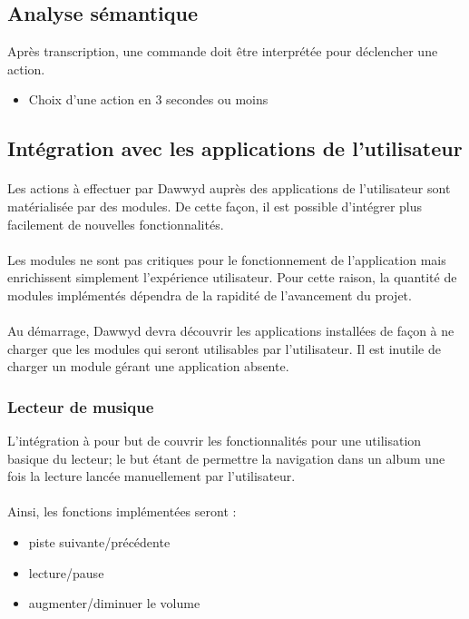 \documentclass[12pt]{article}
\begin{document}
    \subsection{Analyse sémantique}
    Après transcription, une commande doit être interprétée pour déclencher une
    action.
    \begin{itemize}
        \item Choix d'une action en 3 secondes ou moins
    \end{itemize}

    \subsection{Intégration avec les applications de l'utilisateur}
    \paragraph{}
    Les actions à effectuer par Dawwyd auprès des applications de l'utilisateur
    sont matérialisée par des modules. De cette façon, il est possible
    d'intégrer plus facilement de nouvelles fonctionnalités.

    \paragraph{}
    Les modules ne sont pas critiques pour le fonctionnement de l'application
    mais enrichissent simplement l'expérience utilisateur. Pour
    cette raison, la quantité de modules implémentés dépendra de la rapidité
    de l'avancement du projet.

    \paragraph{}
    Au démarrage, Dawwyd devra découvrir les applications installées de façon à
    ne charger que les modules qui seront utilisables par l'utilisateur. Il est
    inutile de charger un module gérant une application absente.

    \subsubsection{Lecteur de musique}
    L'intégration à pour but de couvrir les fonctionnalités pour une utilisation
    basique du lecteur; le but étant de permettre la navigation dans un album
    une fois la lecture lancée manuellement par l'utilisateur.

    \paragraph{}
    Ainsi, les fonctions implémentées seront :
    \begin{itemize}
        \item piste suivante/précédente
        \item lecture/pause
        \item augmenter/diminuer le volume
    \end{itemize}
\end{document}
